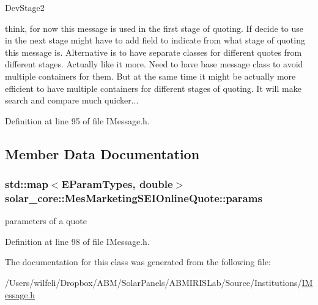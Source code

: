 \begin{DoxyRefDesc}{Dev\+Stage2}
\item[\hyperlink{_dev_stage2__DevStage2000025}{Dev\+Stage2}]think, for now this message is used in the first stage of quoting. If decide to use in the next stage might have to add field to indicate from what stage of quoting this message is. Alternative is to have separate classes for different quotes from different stages. Actually like it more. Need to have base message class to avoid multiple containers for them. But at the same time it might be actually more efficient to have multiple containers for different stages of quoting. It will make search and compare much quicker...\end{DoxyRefDesc}


Definition at line 95 of file I\+Message.\+h.



\subsection{Member Data Documentation}
\hypertarget{classsolar__core_1_1_mes_marketing_s_e_i_online_quote_a985cbf3eb866c4488f0de003c4090aaf}{}
\subsubsection[{params}]{\setlength{\rightskip}{0pt plus 5cm}std\+::map$<${\bf E\+Param\+Types}, double$>$ solar\+\_\+core\+::\+Mes\+Marketing\+S\+E\+I\+Online\+Quote\+::params}\label{classsolar__core_1_1_mes_marketing_s_e_i_online_quote_a985cbf3eb866c4488f0de003c4090aaf}
parameters of a quote 

Definition at line 98 of file I\+Message.\+h.



The documentation for this class was generated from the following file\+:\begin{DoxyCompactItemize}
\item 
/\+Users/wilfeli/\+Dropbox/\+A\+B\+M/\+Solar\+Panels/\+A\+B\+M\+I\+R\+I\+S\+Lab/\+Source/\+Institutions/\hyperlink{_i_message_8h}{I\+Message.\+h}\end{DoxyCompactItemize}
